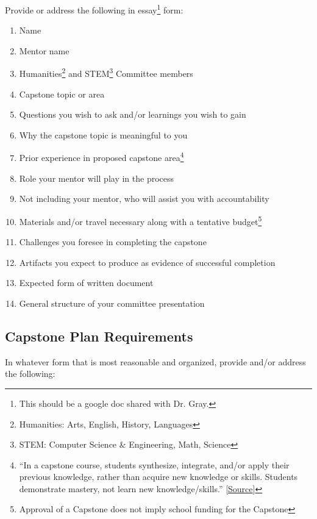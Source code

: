 Provide or address the following in essay\footnote{ This should be a google doc shared with Dr. Gray.} form:
\begin{enumerate}\itemsep=0mm
\item Name
\item Mentor name
\item Humanities\footnote{Humanities:  Arts, English, History, Languages
} and STEM\footnote{STEM:  Computer Science \& Engineering, Math, Science} Committee members
\item Capstone topic or area
\item Questions you wish to ask and/or learnings you wish to gain
\item Why the capstone topic is meaningful to you
\item Prior experience in proposed capstone area\footnote{``In a capstone course, students synthesize, integrate, and/or apply their previous knowledge, rather than acquire new knowledge or skills. Students demonstrate mastery, not learn new knowledge/skills.'' [\href{https://registrar.oregonstate.edu/sites/registrar.oregonstate.edu/files/additional_resources_capstone.pdf}{Source}]}
\item Role your mentor will play in the process
\item Not including your mentor, who will assist you with accountability
\item Materials and/or travel necessary along with a tentative budget\footnote{Approval of a Capstone does not imply school funding for the Capstone
}
\item Challenges you foresee in completing the capstone
\item Artifacts you expect to produce as evidence of successful completion
\item Expected form of written document
\item General structure of your committee presentation

\end{enumerate}

\subsection{Capstone Plan Requirements}

In whatever form that is most reasonable and organized, provide and/or address the following:

